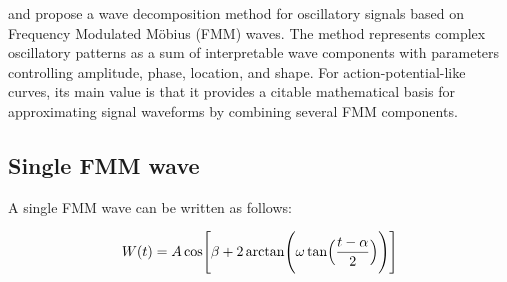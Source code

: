 \documentclass[a4paper]{article}
\begin{document}
        \cite{rueda-2021-a-novel-wave-decomposition-for-oscillatory-signals}
        and
        \cite{rodriguez-collado-2021-identification-of-action-potential-waveforms}
        propose a wave decomposition method for oscillatory signals based on Frequency Modulated M\"obius (FMM) waves.
        The method represents complex oscillatory patterns as a sum of interpretable wave components with parameters controlling amplitude, phase, location, and shape.
        For action-potential-like curves, its main value is that it provides a citable mathematical basis for approximating signal waveforms by combining several FMM components.
        
        \subsection{Single FMM wave}
            
            A single FMM wave can be written as follows:
            
            \begin{equation}
                W(t)
                =
                A
                \cos
                \Biggl[
                    \beta
                    +
                    2
                    \arctan
                    \Biggl(
                    \omega
                    \tan
                    \Bigl(
                    \frac{t-\alpha}{2}
                    \Bigr)
                    \Biggr)
                    \Biggr]
            \end{equation}
            
\end{document}
